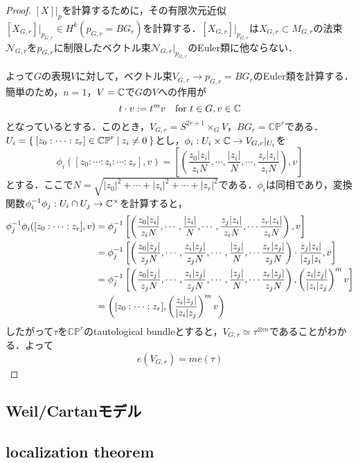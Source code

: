 \begin{proof}
  $[X]|_p$を計算するために，その有限次元近似$[X_{G,r}]|_{p_{G,r}}\in H^k(p_{G,r}=BG_r)$を計算する．$[X_{G,r}]|_{p_{G,r}}$は$X_{G,r}\subset M_{G,r}$の法束$\mathcal{N}_{G,r}$を$p_{G,r}$に制限したベクトル束$\mathcal{N}_{G,r}|_{p_{G,r}}$のEuler類に他ならない．

  よって$G$の表現$V$に対して，ベクトル束$V_{G,r}\rightarrow p_{G,r}=BG_r$のEuler類を計算する．簡単のため，$n=1$，$V=\mathbb{C}$で$G$の$V$への作用が
  \[
  t\cdot v := t^mv \quad \text{for }t\in G,v\in\mathbb{C}
  \]
  となっているとする．このとき，$V_{G,r} = S^{2r+1}\times_G V$，$BG_r = \mathbb{CP}^r$である．$U_i = \left\{\:[z_0:\cdots:z_r]\in\mathbb{CP}^r\:\middle|\:z_i\neq 0\:\right\}$とし，$\phi_i:U_i\times \mathbb{C}\rightarrow V_{G,r}|_{U_i}$を
  \[
  \phi_i([z_0:\cdots:z_i:\cdots:z_r],v) = \left[\left(\frac{z_0|z_i|}{z_iN},\cdots,\frac{|z_i|}{N},\cdots,\frac{z_r|z_i|}{z_iN}\right), v \right]
  \]
  とする．ここで$N=\sqrt{|z_0|^2+\cdots+|z_i|^2+\cdots+|z_r|^2}$である．$\phi_i$は同相であり，変換関数$\phi_i^{-1}\phi_j:U_i\cap U_j\rightarrow \mathbb{C}^\times$を計算すると，
  \begin{align*}
    \phi_j^{-1}\phi_i([z_0:\cdots:z_r],v)
    &= \phi_j^{-1}\left[\left(\frac{z_0|z_i|}{z_iN},\cdots,\frac{|z_i|}{N},\cdots,\frac{z_j|z_i|}{z_iN},\cdots\frac{z_r|z_i|}{z_iN}\right), v \right]\\
    &=\phi_j^{-1}\left[\left(\frac{z_0|z_j|}{z_jN},\cdots,\frac{z_i|z_j|}{z_jN},\cdots,\frac{|z_j|}{N},\cdots\frac{z_r|z_j|}{z_jN}\right)\cdot \frac{z_j|z_i|}{|z_j|z_i},v\right]\\
    &=\phi_j^{-1}\left[\left(\frac{z_0|z_j|}{z_jN},\cdots,\frac{z_i|z_j|}{z_jN},\cdots,\frac{|z_j|}{N},\cdots\frac{z_r|z_j|}{z_jN}\right) , \left(\frac{z_i|z_j|}{|z_i|z_j}\right)^mv\right]\\
    &=\left([z_0:\cdots:z_r],\left(\frac{z_i|z_j|}{|z_i|z_j}\right)^mv\right)
  \end{align*}
  したがって$\tau$を$\mathbb{CP}^r$のtautological bundleとすると，$V_{G,r}\simeq \tau^{\otimes m}$であることがわかる．よって
  \[
  e(V_{G,r}) = m e(\tau)
  \]
\end{proof}


\subsection{Weil/Cartanモデル}





\subsection{localization theorem}


